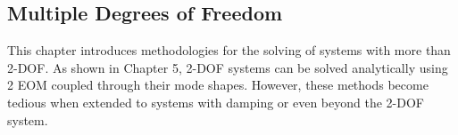 \documentclass[12pt,letter]{article}
\begin{document}
\begin{example}
	
	\end{example}
	
	
	
	
	
	
	

%
%
%	

%	
	
	
	
	
	
	\subsection{Multiple Degrees of Freedom}
	
	This chapter introduces methodologies for the solving of systems with more than 2-DOF. As shown in Chapter 5, 2-DOF systems can be solved analytically using 2 EOM coupled through their mode shapes. However, these methods become tedious when extended to systems with damping or even beyond the 2-DOF system.
	
\end{document}
